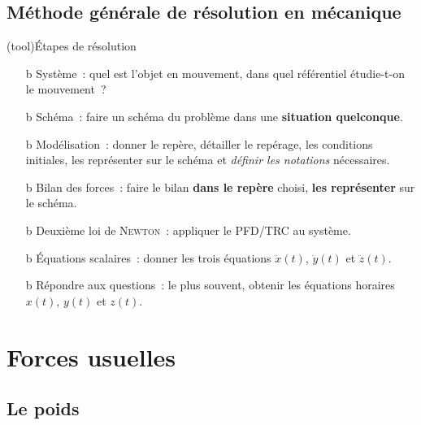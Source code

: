 \documentclass[../../main/main.tex]{subfiles}
\begin{document}
\subsection{Méthode générale de résolution en mécanique}
\begin{tcb*}(tool){Étapes de résolution}
	\begin{enumerate}[label=\sqenumi]
		\item[b]{Système}~: quel est l'objet en mouvement, dans quel
		      référentiel étudie-t-on le mouvement~?

		\item[b]{Schéma}~: faire un schéma du problème dans une \textbf{situation
			      quelconque}.

		\item[b]{Modélisation}~: donner le repère, détailler le repérage, les
		      conditions initiales, les représenter sur le schéma et \textit{définir
			      les notations} nécessaires.

		\item[b]{Bilan des forces}~: faire le bilan \textbf{dans le repère} choisi,
		      \textbf{les représenter} sur le schéma.

		\item[b]{Deuxième loi de \textsc{Newton}}~: appliquer le PFD/TRC au système.

		\item[b]{Équations scalaires}~: donner les trois équations $\ddot{x}(t)$,
		      $\ddot{y}(t)$ et $\ddot{z}(t)$.

		\item[b]{Répondre aux questions}~: le plus souvent, obtenir les équations
		      horaires $x(t)$, $y(t)$ et $z(t)$.
	\end{enumerate}
\end{tcb*}


\section{Forces usuelles}
\subsection{Le poids}
\end{document}
